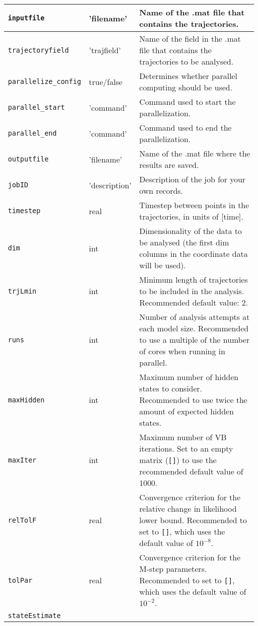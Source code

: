 \begin{longtable}{|m{}|>{\centering\arraybackslash}m{}|m{}|}
\texttt{inputfile} & 'filename' & Name of the .mat file that contains the trajectories.\\ 
[0.5ex] \hline 
\texttt{trajectoryfield} & 'trajfield' & Name of the field in the .mat file that contains the
trajectories to be analysed.\\ 
[0.5ex] \hline
\texttt{parallelize\_config} & true/false & Determines whether parallel computing should be used.\\ 
[0.5ex] \hline
\texttt{parallel\_start} & 'command' & Command used to start the parallelization.\\ 
[0.5ex] \hline 
\texttt{parallel\_end} & 'command' & Command used to end the parallelization.\\ 
[0.5ex] \hline 
\texttt{outputfile } & 'filename' & Name of the .mat file where the results are saved.\\ 
[0.5ex] \hline
\texttt{jobID} & 'description' & Description of the job for your own records.\\ 
[0.5ex] \hline \texttt{timestep} & real & Timestep between points in the trajectories, in units of [time].\\ 
[0.5ex] \hline
\texttt{dim} & int & Dimensionality of the data to be analysed (the first dim columns in the coordinate data will be used).\\ 
[0.5ex] \hline 
\texttt{trjLmin} & int & Minimum length of trajectories to be included in the analysis. Recommended default value: 2.\\ 
[0.5ex] \hline 
\texttt{runs} & int & Number of analysis attempts at each model size. Recommended to use a multiple of the number of cores when running in parallel.\\ 
[0.5ex] \hline 
\texttt{maxHidden} & int & Maximum number of hidden states to consider. Recommended to use twice the amount of expected hidden states.\\ 
[0.5ex] \hline
\texttt{maxIter} & int & Maximum number of VB iterations. Set to an empty matrix (\texttt{[]}) to use the recommended default value of
1000.\\ [0.5ex] \hline \texttt{relTolF} & real & Convergence criterion
for the relative change in likelihood lower bound. Recommended to set
to \texttt{[]}, which uses the default value of $10^{-8}$.\\[0.5ex]
\hline \texttt{tolPar} & real & Convergence criterion for the M-step
parameters. Recommended to set to \texttt{[]}, which uses the default
value of $10^{-2}$.\\[0.5ex] \hline \texttt{stateEstimate} &

\end{longtable}

